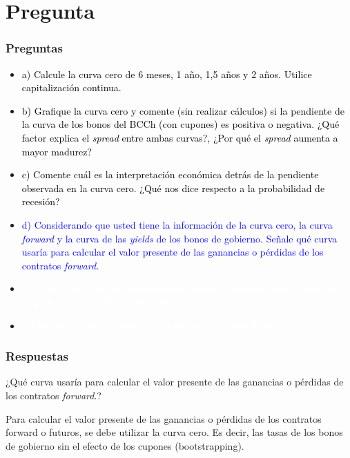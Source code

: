 \documentclass{beamer}
\newif\ifpresentacion
\newcommand{\pausa}{\ifpresentacion\pause\fi}
\begin{document}
\section{Pregunta }

\begin{frame}
  \frametitle{Preguntas}
  \begin{itemize}
    \scriptsize
    \item {\textcolor{black}{a) Calcule la curva cero de 6 meses, 1 año, 1,5 años y 2 años. Utilice capitalización continua.}}
    \vspace{3pt}
    \item {\textcolor{black}{b) Grafique la curva cero y comente (sin realizar cálculos) si la pendiente de la curva de los bonos del BCCh (con cupones) es positiva o negativa. ¿Qué factor explica el \textit{spread} entre ambas curvas?, ¿Por qué el \textit{spread} aumenta a mayor madurez?}}
    \vspace{3pt}
    \item {\textcolor{black}{c) Comente cuál es la interpretación económica detrás de la pendiente observada en la curva cero. ¿Qué nos dice respecto a la probabilidad de recesión?}}
    \vspace{3pt}
    \item {\Large\textcolor{blue}{d) Considerando que usted tiene la información de la curva cero, la curva \textit{forward} y la curva de las \textit{yields} de los bonos de gobierno. Señale qué curva usaría para calcular el valor presente de las ganancias o pérdidas de los contratos \textit{forward}.}}
    \vspace{3pt}
    \item {\textcolor{white}{e) ¿Cuál es el rol de las probabilidades neutrales al riesgo en d)?, ¿Qué rol juega la condición de no arbitraje?}}
    \vspace{3pt}
    \item {\textcolor{white}{f) Calcule el punto a) utilizando matrices en Excel/R/Python.}}
    \vspace{3pt}
  \end{itemize}
\end{frame}

\begin{frame}
  \frametitle{Respuestas }
  \begin{block}{ ¿Qué curva usaría para calcular el valor presente de las ganancias o pérdidas de los contratos \textit{forward}.?}
    \pausa
    Para calcular el valor presente de las ganancias o pérdidas de los contratos forward o
    futuros, se debe utilizar la curva cero. Es decir, las tasas de los bonos de gobierno sin el
    efecto de los cupones (bootstrapping).
  \end{block}
\end{frame}
\end{document}
